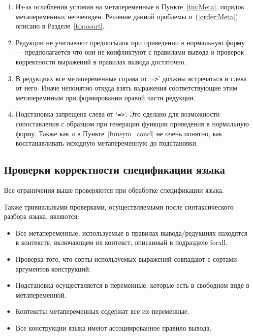 \begin{enumerate}
\item Из-за ослабления условия на метапеременные в Пункте~\ref{tm:Meta}, порядок метапеременных неочевиден. Решение данной проблемы и~(\ref{order:Meta}) описано в Разделе~\ref{toposort}.

\item Редукции не учитывают предпосылок при приведении в нормальную форму --- предполагается что они не конфликтуют с правилами вывода и проверок корректности выражений в правилах вывода достаточно.

\item В редукциях все метапеременные справа от `\lstinline{=>}' должны встречаться и слева от него. Иначе непонятно откуда взять выражения соответствующие этим метаперемнным при формировании правой части редукции.

\item Подстановка запрещена слева от `\lstinline{=>}'. Это сделано для возможности сопоставления с образцом при генерации функции приведения в нормальную форму. Также как и в Пункте~\ref{funsym_concl} не очень понятно, как восстанавливать исходную метапеременную до подстановки.


\end{enumerate}

\subsection{Проверки корректности спецификации языка}

Все ограничения выше проверяются при обработке спецификации языка.

Также тривиальными проверками, осуществляемыми после синтаксического разбора языка, являются:
\begin{itemize}
\item Все метапеременные, используемые в правилах вывода/редукциях находятся в контексте, включающем их контекст, описанный в подразделе forall.
\item Проверка того, что сорты используемых выражений совпадают с сортами аргументов конструкций.
\item Подстановка осуществляется в переменные, которые есть в свободном виде в метапеременной.
\item Контексты метапеременных содержат все их переменные.
\item Все конструкции языка имеют ассоциированное правило вывода.
\end{itemize}
